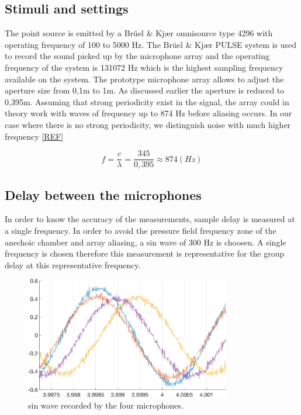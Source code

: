  
 
 


\subsection{Stimuli and settings}

The point source is emitted by a Brüel \& Kjær omnisource type 4296 with operating frequency of 100 to 5000 Hz. The Brüel \& Kjær PULSE system is used to record the sound picked up by the microphone array and the operating frequency of the system is 131072 Hz which is the highest sampling frequency available on the system. The prototype microphone array allows to adjust the aperture size from 0,1m to 1m. As discussed earlier the aperture is reduced to 0,395m. Assuming that strong periodicity exist in the signal, the array could in theory work with waves of frequency up to 874 Hz before aliasing occurs. In our case where there is no strong periodicity, we distinguish noise with much higher frequency \ref{REF}

\begin{equation}
    f=\frac{c}{\lambda}=\frac{345}{0,395} \approx 874 (Hz)
\end{equation}



 
 
 \subsection{Delay between the microphones}
 
 In order to know the accuracy of the measurements, sample delay is measured at a single frequency. In order to avoid the pressure field frequency zone of the anechoic chamber and array aliasing,  a sin wave of 300 Hz is choosen. A single frequency is chosen therefore this measurement is representative for the group delay at this representative frequency. 
 
 
 \begin{figure}[H]
    \centering
    \includegraphics[width=0.8\textwidth]{Figures/delaytetra300Hz.png}
    \caption{sin wave recorded by the four microphones.}
    \label{fig:pinknoise}
\end{figure}
 
